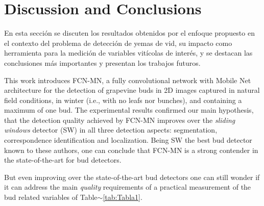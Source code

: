 \documentclass[a4paper,authoryear,review]{elsarticle}
\begin{document}
	
	
	
	
	\section{Discussion and Conclusions} \label{sec:discussion}
	
	En esta sección se discuten los resultados obtenidos por el enfoque propuesto en el contexto del problema de detección de yemas de vid, su impacto como herramienta para la medición de variables vitícolas de interés, y se destacan las conclusiones más importantes y presentan los trabajos futuros. 
	
	
	This work introduces FCN-MN, a fully convolutional network with Mobile Net architecture for the detection of grapevine buds in 2D images captured in natural field conditions, in winter (i.e., with no leafs nor bunches), and containing a maximum of one bud.
	The experimental results confirmed our main hypothesis, that the detection quality achieved by FCN-MN improves over the \emph{sliding windows} detector (SW) in all three detection aspects: segmentation, correspondence identification and localization. Being SW the best bud detector known to these authors, one can conclude that FCN-MN is a strong contender in the state-of-the-art for bud detectors.
	
	
	
	
	But even improving over the state-of-the-art bud detectors one can still wonder if it can address the main \emph{quality} requirements of a practical measurement of the bud related variables of Table$\sim$\ref{tab:Tabla1}.
	
\end{document}
